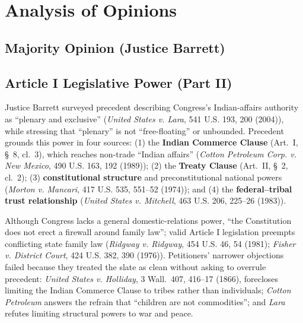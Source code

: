 \documentclass[12pt]{article}
\begin{document}
\section{Analysis of Opinions}
\subsection{Majority Opinion (Justice Barrett)}

\subsection{Article I Legislative Power (Part II)}
Justice Barrett surveyed precedent describing Congress's Indian-affairs authority as ``plenary and exclusive'' (\textit{United States v. Lara}, 541 U.S. 193, 200 (2004)), while stressing that ``plenary'' is not ``free-floating'' or unbounded. Precedent grounds this power in four sources: (1) the \textbf{Indian Commerce Clause} (Art.~I, \S~8, cl.~3), which reaches non-trade ``Indian affairs'' (\textit{Cotton Petroleum Corp. v. New Mexico}, 490 U.S. 163, 192 (1989)); (2) the \textbf{Treaty Clause} (Art.~II, \S~2, cl.~2); (3) \textbf{constitutional structure} and preconstitutional national powers (\textit{Morton v. Mancari}, 417 U.S. 535, 551--52 (1974)); and (4) the \textbf{federal--tribal trust relationship} (\textit{United States v. Mitchell}, 463 U.S. 206, 225--26 (1983)).

Although Congress lacks a general domestic-relations power, ``the Constitution does not erect a firewall around family law''; valid Article I legislation preempts conflicting state family law (\textit{Ridgway v. Ridgway}, 454 U.S. 46, 54 (1981); \textit{Fisher v. District Court}, 424 U.S. 382, 390 (1976)). Petitioners' narrower objections failed because they treated the slate as clean without asking to overrule precedent: \textit{United States v. Holliday}, 3 Wall.~407, 416--17 (1866), forecloses limiting the Indian Commerce Clause to tribes rather than individuals; \textit{Cotton Petroleum} answers the refrain that ``children are not commodities''; and \textit{Lara} refutes limiting structural powers to war and peace.
\end{document}
